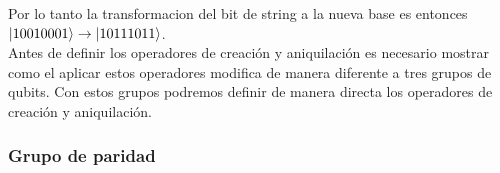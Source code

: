 \documentclass[12pt, oneside]{article}
\begin{document}
Por lo tanto la transformacion del bit de string a la nueva base es entonces $\ket{10010001}\rightarrow\ket{10111011}$.\\

Antes de definir los operadores de creación y aniquilación es necesario mostrar como el aplicar estos operadores modifica de manera diferente a tres grupos de qubits. Con estos grupos podremos definir de manera directa los operadores de creación y aniquilación.

\subsubsection{Grupo de paridad}
\end{document}
